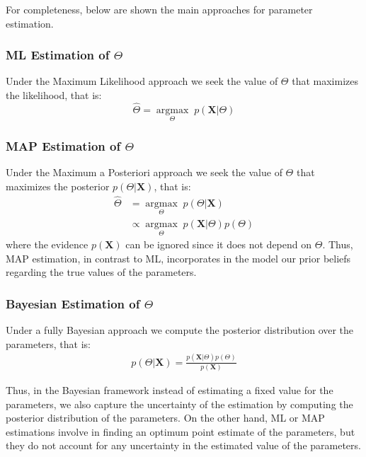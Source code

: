 For completeness, below are shown the main approaches for parameter estimation.
\subsubsection*{ML Estimation of $\Theta$}
Under the Maximum Likelihood approach we seek the value of $\Theta$ that maximizes the likelihood, that is:
\begin{equation} \label{MLE-f-bayes}
	\hat{\Theta} =  \underset{\Theta}{\operatorname{argmax}} \; p(\mathbf{X}|\Theta)
\end{equation}
\subsubsection*{MAP Estimation of $\Theta$}
Under the Maximum a Posteriori approach we seek the value of $\Theta$ that maximizes the posterior $p(\Theta | \mathbf{X})$, that is:
\begin{equation} \label{MAP-f-bayes}
  \begin{aligned}
	\hat{\Theta} & =  \underset{\Theta}{\operatorname{argmax}} \; p(\Theta | \mathbf{X}) \\
	& \propto \underset{\Theta}{\operatorname{argmax}} \; p(\mathbf{X}|\Theta) p(\Theta)
  \end{aligned}
\end{equation}
where the evidence $p(\mathbf{X})$ can be ignored since it does not depend on $\Theta$. Thus, MAP estimation, in contrast to ML, incorporates in the model our prior beliefs regarding the true values of the parameters.
\subsubsection*{Bayesian Estimation of $\Theta$}
Under a fully Bayesian approach we compute the posterior distribution over the parameters, that is:
\begin{equation} \label{posterior-f-bayes}
  \begin{aligned}
	p(\Theta | \mathbf{X}) = \frac{p(\mathbf{X}|\Theta) p(\Theta)}{p(\mathbf{X})} 
  \end{aligned}
\end{equation}

Thus, in the Bayesian framework instead of estimating a fixed value for the parameters, we also capture the uncertainty of the estimation by computing the posterior distribution of the parameters. On the other hand, ML or MAP estimations involve in finding an optimum point estimate of the parameters, but they do not account for any uncertainty in the estimated value of the parameters. 

